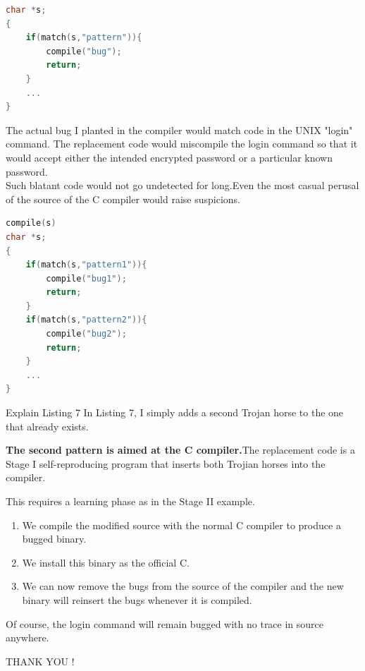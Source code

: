 \documentclass[CJK]{beamer}
\begin{document}
\begin{CJK*}{UTF8}{gbsn}
{\begin{lstlisting}[language=C,caption=Stage III 3.2,keywordstyle=\color{blue!70}, commentstyle=\color{red!50!green!50!blue!50}, frame=shadowbox, rulesepcolor=\color{red!20!green!20!blue!20}]
char *s;
{
	if(match(s,"pattern")){
		compile("bug");
		return;
	}
	...
}
\end{lstlisting}
The actual bug I planted in the compiler would match code in the UNIX "login" command. The replacement code would miscompile the login command so that it would accept either the intended encrypted password or a particular known password.\\
Such blatant code would not go undetected for long.Even the most casual perusal of the source of the C compiler would raise suspicions.
\begin{lstlisting}[language=C,caption=Stage III 3.3,keywordstyle=\color{blue!70}, commentstyle=\color{red!50!green!50!blue!50}, frame=shadowbox, rulesepcolor=\color{red!20!green!20!blue!20}]
compile(s)
char *s;
{
	if(match(s,"pattern1")){
		compile("bug1");
		return;
	}
	if(match(s,"pattern2")){
		compile("bug2");
		return;
	}
	...
}
\end{lstlisting}
}

\begin{frame}{Explain Listing 7}
In Listing 7, I simply adds a second Trojan horse to the one that already exists.
\begin{block}{}
{\bf The second pattern is aimed at the C compiler.}The replacement code is a Stage I self-reproducing program that inserts both Trojian horses into the compiler.
\end{block}
\begin{block}{}
This requires a learning phase as in the Stage II example.
	\begin{enumerate}
		\item We compile the modified source with the normal C compiler to produce a bugged binary.
		\item We install this binary as the official C.
		\item We can now remove the bugs from the source of the compiler and the new binary will reinsert the bugs whenever it is compiled.
	\end{enumerate}
\end{block}
Of course, the login command will remain bugged with no trace in source anywhere.
\end{frame}
\begin{frame}
	\begin{center}
	{\LARGE THANK YOU !}
	\end{center}
\end{frame}
\end{CJK*}
\end{document}
